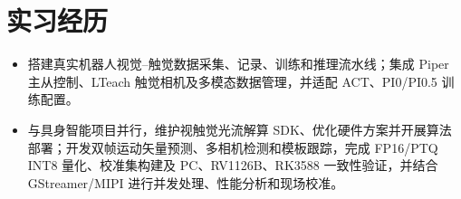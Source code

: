 
\section{实习经历}

\begin{itemize}
\cvprojectbodyfont
    \item 搭建真实机器人视觉--触觉数据采集、记录、训练和推理流水线；集成 Piper 主从控制、LTeach 触觉相机及多模态数据管理，并适配 ACT、PI0/PI0.5 训练配置。
    \item 与具身智能项目并行，维护视触觉光流解算 SDK、优化硬件方案并开展算法部署；开发双帧运动矢量预测、多相机检测和模板跟踪，完成 FP16/PTQ INT8 量化、校准集构建及 PC、RV1126B、RK3588 一致性验证，并结合 GStreamer/MIPI 进行并发处理、性能分析和现场校准。
\end{itemize}

